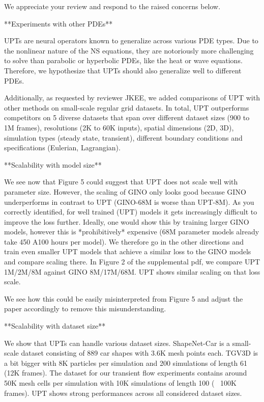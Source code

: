 We appreciate your review and respond to the raised concerns below.

**Experiments with other PDEs**

UPTs are neural operators known to generalize across various PDE types. Due to the nonlinear nature of the NS equations, they are notoriously more challenging to solve than parabolic or hyperbolic PDEs, like the heat or wave equations. Therefore, we hypothesize that UPTs should also generalize well to different PDEs.


Additionally, as requested by reviewer JKEE, we added comparisons of UPT with other methods on small-scale regular grid datasets. In total, UPT outperforms competitors on 5 diverse datasets that span over different dataset sizes (900 to 1M frames), resolutions (2K to 60K inputs), spatial dimensions (2D, 3D), simulation types (steady state, transient), different boundary conditions and specifications (Eulerian, Lagrangian).



**Scalability with model size**


We see now that Figure 5 could suggest that UPT does not scale well with parameter size. However, the scaling of GINO only looks good because GINO   underperforms in contrast to UPT (GINO-68M is worse than UPT-8M). As you correctly identified, for well trained (UPT) models it gets increasingly difficult to improve the loss further. Ideally, one would show this by training larger GINO models, however this is *prohibitively* expensive (68M parameter models already take 450 A100 hours per model). We therefore go in the other directions and train even smaller UPT models that achieve a similar loss to the GINO models and compare scaling there. In Figure 2 of the supplemental pdf, we compare UPT 1M/2M/8M against GINO 8M/17M/68M. UPT shows similar scaling on that loss scale.

We see how this could be easily misinterpreted from Figure 5 and adjust the paper accordingly to remove this misunderstanding.











**Scalability with dataset size**

We show that UPTs can handle various dataset sizes. ShapeNet-Car is a small-scale dataset consisting of 889 car shapes with 3.6K mesh points each. TGV3D is a bit bigger with 8K particles per simulation and 200 simulations of length 61 (12K frames). The dataset for our transient flow experiments contains around 50K mesh cells per simulation with 10K simulations of length 100 (~ 100K frames).
UPT shows strong performances across all considered dataset sizes.



